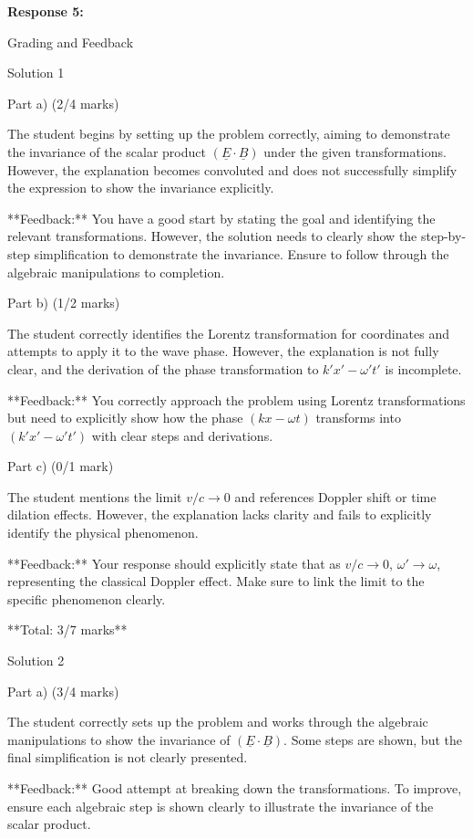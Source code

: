 \documentclass[a4paper,11pt]{article}
\begin{document}
\bigskip
\textbf{Response 5:}

Grading and Feedback

Solution 1

Part a) (2/4 marks)

The student begins by setting up the problem correctly, aiming to demonstrate the invariance of the scalar product \((\underline{E} \cdot \underline{B})\) under the given transformations. However, the explanation becomes convoluted and does not successfully simplify the expression to show the invariance explicitly.

**Feedback:** You have a good start by stating the goal and identifying the relevant transformations. However, the solution needs to clearly show the step-by-step simplification to demonstrate the invariance. Ensure to follow through the algebraic manipulations to completion.

Part b) (1/2 marks)

The student correctly identifies the Lorentz transformation for coordinates and attempts to apply it to the wave phase. However, the explanation is not fully clear, and the derivation of the phase transformation to \(k'x' - \omega' t'\) is incomplete.

**Feedback:** You correctly approach the problem using Lorentz transformations but need to explicitly show how the phase \( (kx - \omega t) \) transforms into \( (k'x' - \omega' t') \) with clear steps and derivations.

Part c) (0/1 mark)

The student mentions the limit \(v/c \rightarrow 0\) and references Doppler shift or time dilation effects. However, the explanation lacks clarity and fails to explicitly identify the physical phenomenon.

**Feedback:** Your response should explicitly state that as \(v/c \rightarrow 0\), \(\omega' \rightarrow \omega\), representing the classical Doppler effect. Make sure to link the limit to the specific phenomenon clearly.

**Total: 3/7 marks**

Solution 2

Part a) (3/4 marks)

The student correctly sets up the problem and works through the algebraic manipulations to show the invariance of \((\underline{E} \cdot \underline{B})\). Some steps are shown, but the final simplification is not clearly presented.

**Feedback:** Good attempt at breaking down the transformations. To improve, ensure each algebraic step is shown clearly to illustrate the invariance of the scalar product.
\end{document}

